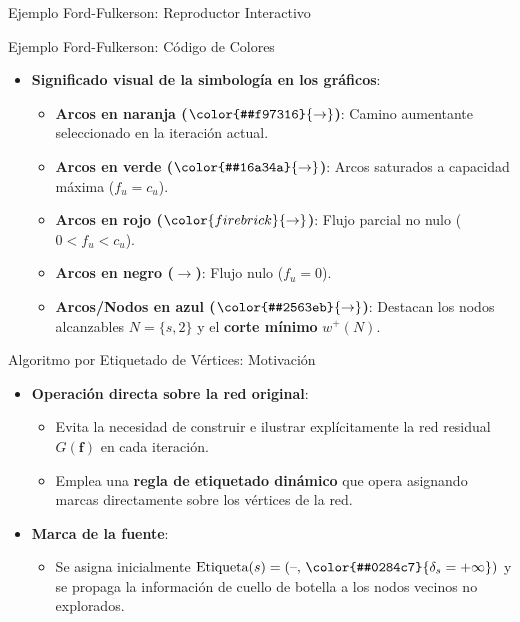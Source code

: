 \documentclass[
  ignorenonframetext,
]{beamer}
\providecommand{\tightlist}{%
  \setlength{\itemsep}{0pt}\setlength{\parskip}{0pt}}
\begin{document}
\begin{frame}{Ejemplo Ford-Fulkerson: Reproductor Interactivo}
\label{ejemplo-ford-fulkerson-reproductor-interactivo}
\end{frame}

\begin{frame}{Ejemplo Ford-Fulkerson: Código de Colores}
\label{ejemplo-ford-fulkerson-cuxf3digo-de-colores}
\begin{itemize}
\tightlist
\item
  \textbf{Significado visual de la simbología en los gráficos}:

  \begin{itemize}
  \tightlist
  \item
    \textbf{Arcos en naranja (\(\color{#f97316}{\rightarrow}\))}: Camino
    aumentante seleccionado en la iteración actual.
  \item
    \textbf{Arcos en verde (\(\color{#16a34a}{\rightarrow}\))}: Arcos
    saturados a capacidad máxima (\(f_u = c_u\)).
  \item
    \textbf{Arcos en rojo (\(\color{firebrick}{\rightarrow}\))}: Flujo
    parcial no nulo (\(0 < f_u < c_u\)).
  \item
    \textbf{Arcos en negro (\(\rightarrow\))}: Flujo nulo (\(f_u = 0\)).
  \item
    \textbf{Arcos/Nodos en azul (\(\color{#2563eb}{\rightarrow}\))}:
    Destacan los nodos alcanzables \(N = \{s, 2\}\) y el \textbf{corte
    mínimo} \(w^+(N)\).
  \end{itemize}
\end{itemize}
\end{frame}

\begin{frame}{Algoritmo por Etiquetado de Vértices: Motivación}
\label{algoritmo-por-etiquetado-de-vuxe9rtices-motivaciuxf3n}
\begin{itemize}
\tightlist
\item
  \textbf{Operación directa sobre la red original}:

  \begin{itemize}
  \tightlist
  \item
    Evita la necesidad de construir e ilustrar explícitamente la red
    residual \(G(\mathbf{f})\) en cada iteración.
  \item
    Emplea una \textbf{regla de etiquetado dinámico} que opera asignando
    marcas directamente sobre los vértices de la red.
  \end{itemize}
\item
  \textbf{Marca de la fuente}:

  \begin{itemize}
  \tightlist
  \item
    Se asigna inicialmente
    \(\text{Etiqueta}(s) = (\text{–}, \, \color{#0284c7}{\delta_s = +\infty})\)
    y se propaga la información de cuello de botella a los nodos vecinos
    no explorados.
  \end{itemize}
\end{itemize}
\end{frame}
\end{document}
